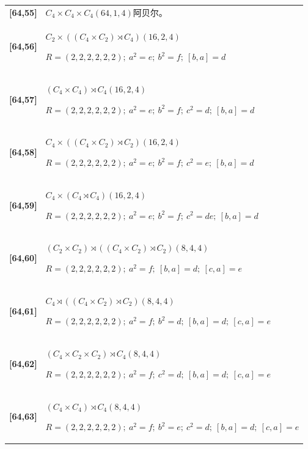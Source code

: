 \documentclass[UTF8,fontset=fandol,11pt,a4paper]{ctexart}
\begin{document}
\begin{longtable}{@{}p{17mm}>{\raggedright\arraybackslash}p{141mm}@{}}
\textbf{[64,55]} & $C_{4}\times C_{4}\times C_{4}$\quad $(64,1,4)$\quad 阿贝尔。\\[3pt]

\textbf{[64,56]} & $C_{2}\times ((C_{4}\times C_{2})\rtimes C_{4})$\quad $(16,2,4)$\par\(R=(2,2,2,2,2,2);\allowbreak\ a^{2}=e;\allowbreak\ b^{2}=f;\allowbreak\ [b,a]=d\)\\[3pt]

\textbf{[64,57]} & $(C_{4}\times C_{4})\rtimes C_{4}$\quad $(16,2,4)$\par\(R=(2,2,2,2,2,2);\allowbreak\ a^{2}=e;\allowbreak\ b^{2}=f;\allowbreak\ c^{2}=d;\allowbreak\ [b,a]=d\)\\[3pt]

\textbf{[64,58]} & $C_{4}\times ((C_{4}\times C_{2})\rtimes C_{2})$\quad $(16,2,4)$\par\(R=(2,2,2,2,2,2);\allowbreak\ a^{2}=e;\allowbreak\ b^{2}=f;\allowbreak\ c^{2}=e;\allowbreak\ [b,a]=d\)\\[3pt]

\textbf{[64,59]} & $C_{4}\times (C_{4}\rtimes C_{4})$\quad $(16,2,4)$\par\(R=(2,2,2,2,2,2);\allowbreak\ a^{2}=e;\allowbreak\ b^{2}=f;\allowbreak\ c^{2}=de;\allowbreak\ [b,a]=d\)\\[3pt]

\textbf{[64,60]} & $(C_{2}\times C_{2})\rtimes ((C_{4}\times C_{2})\rtimes C_{2})$\quad $(8,4,4)$\par\(R=(2,2,2,2,2,2);\allowbreak\ a^{2}=f;\allowbreak\ [b,a]=d;\allowbreak\ [c,a]=e\)\\[3pt]

\textbf{[64,61]} & $C_{4}\rtimes ((C_{4}\times C_{2})\rtimes C_{2})$\quad $(8,4,4)$\par\(R=(2,2,2,2,2,2);\allowbreak\ a^{2}=f;\allowbreak\ b^{2}=d;\allowbreak\ [b,a]=d;\allowbreak\ [c,a]=e\)\\[3pt]

\textbf{[64,62]} & $(C_{4}\times C_{2}\times C_{2})\rtimes C_{4}$\quad $(8,4,4)$\par\(R=(2,2,2,2,2,2);\allowbreak\ a^{2}=f;\allowbreak\ c^{2}=d;\allowbreak\ [b,a]=d;\allowbreak\ [c,a]=e\)\\[3pt]

\textbf{[64,63]} & $(C_{4}\times C_{4})\rtimes C_{4}$\quad $(8,4,4)$\par\(R=(2,2,2,2,2,2);\allowbreak\ a^{2}=f;\allowbreak\ b^{2}=e;\allowbreak\ c^{2}=d;\allowbreak\ [b,a]=d;\allowbreak\ [c,a]=e\)\\[3pt]


\end{longtable}
\end{document}
